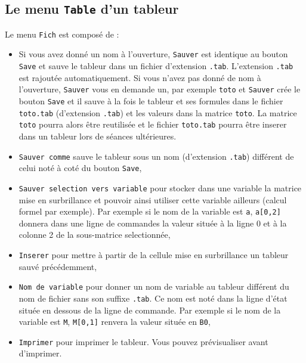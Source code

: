 \documentclass[a4paper,11pt]{book}
\begin{document}
\subsection{Le menu {\tt Table} d'un tableur}
Le menu {\tt Fich} est compos\'e de :
\begin{itemize}
\item Si vous avez donn\'e un nom \`a l'ouverture, {\tt Sauver} est identique 
au bouton {\tt Save} et sauve le tableur dans un fichier d'extension {\tt .tab}. L'extension {\tt .tab} est rajout\'ee 
automatiquement. Si vous n'avez pas donn\'e de nom \`a l'ouverture, 
{\tt Sauver} vous en 
demande un, par exemple {\tt toto} et  {\tt Sauver} cr\'ee le bouton {\tt Save} et il sauve \`a la 
fois le tableur et ses formules dans le fichier {\tt toto.tab} (d'extension 
{\tt .tab}) et les valeurs dans la matrice {\tt toto}. La matrice {\tt toto} 
pourra alors \^etre reutilis\'ee et le fichier {\tt toto.tab} pourra \^etre inserer dans un tableur lors de s\'eances ult\'erieures.
\item {\tt Sauver comme}  sauve le tableur sous un nom (d'extension
{\tt .tab}) diff\'erent de celui not\'e \`a cot\'e du bouton {\tt Save},
\item {\tt Sauver selection vers variable} pour stocker dans une variable
 la matrice mise en surbrillance et pouvoir ainsi utiliser cette variable 
ailleurs (calcul formel par exemple). Par exemple si le nom de la variable est
{\tt a}, {\tt a[0,2]} donnera dans une ligne de commandes la valeur situ\'ee 
\`a la ligne 0 et \`a la colonne 2  de la sous-matrice selectionn\'ee,
\item {\tt Inserer} pour mettre \`a partir de la cellule mise en surbrillance 
un tableur sauv\'e pr\'ec\'edemment,
\item {\tt Nom de variable} pour donner un nom de variable au tableur 
diff\'erent du nom de fichier sans son suffixe {\tt .tab}. Ce nom est not\'e 
dans la ligne d'\'etat situ\'ee en dessous de la ligne de commande. Par exemple
si le nom de la variable est {\tt M}, {\tt M[0,1]} renvera la valeur situ\'ee 
en {\tt B0},
\item {\tt Imprimer} pour imprimer le tableur. Vous pouvez pr\'evisualiser 
avant d'imprimer.
\end{itemize}
\end{document}
